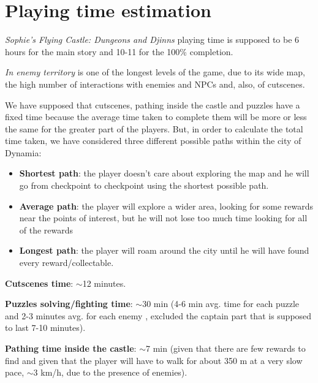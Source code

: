 \section{Playing time estimation}
\textit{Sophie's Flying Castle: Dungeons and Djinns} playing time is supposed to be 6 hours for the main story and 10-11 for the 100\% completion.

\textit{In enemy territory} is one of the longest levels of the game, due to its wide map, the high number of interactions with enemies and NPCs and, also, of cutscenes.

We have supposed that cutscenes, pathing inside the castle and puzzles have a fixed time because the average time taken to complete them will be more or less the same for the greater part of the players. But, in order to calculate the total time taken, we have considered three different possible paths within the city of Dynamia:
\begin{itemize}
\item \textbf{Shortest path}: the player doesn't care about exploring the map and he will go from checkpoint to checkpoint using the shortest possible path.
\item \textbf{Average path}: the player will explore a wider area, looking for some rewards near the points of interest, but he will not lose too much time looking for all of the rewards
\item \textbf{Longest path}: the player will roam around the city until he will have found every reward/collectable.
\end{itemize}
\textbf{Cutscenes time}: $\sim$12 minutes.

\textbf{Puzzles solving/fighting time}: $\sim$30 min (4-6 min avg. time for each puzzle and 2-3 minutes avg. for each enemy , excluded the captain part that is supposed to last 7-10 minutes).

\textbf{Pathing time inside the castle}: $\sim$7 min (given that there are few rewards to find and given that the player will have to walk for about 350 m at a very slow pace, $\sim$3 km/h, due to the presence of enemies).

